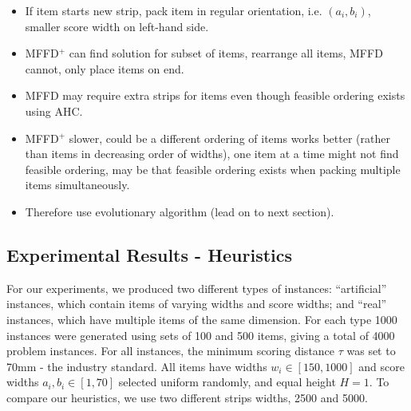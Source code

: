\documentclass{elsarticle}
\begin{document}
\begin{itemize}
	\item If item starts new strip, pack item in regular orientation, i.e. $(a_i, b_i)$, smaller score width on left-hand side.
	\item MFFD$^+$ can find solution for subset of items, rearrange all items, MFFD cannot, only place items on end.
	\item MFFD may require extra strips for items even though feasible ordering exists using AHC.
	\item MFFD$^+$ slower, could be a different ordering of items works better (rather than items in decreasing order of widths), one item at a time might not find feasible ordering, may be that feasible ordering exists when packing multiple items simultaneously.
	\item Therefore use evolutionary algorithm (lead on to next section).
\end{itemize}


\subsection{Experimental Results - Heuristics}
\label{sub:expheuristics}
For our experiments, we produced two different types of instances: ``artificial'' instances, which contain items of varying widths and score widths; and ``real'' instances, which have multiple items of the same dimension. For each type 1000 instances were generated using sets of 100 and 500 items, giving a total of 4000 problem instances. For all instances, the minimum scoring distance $\tau$ was set to 70mm - the industry standard. All items have widths $w_i \in [150,1000]$ and score widths $a_i, b_i \in [1,70]$ selected uniform randomly, and equal height $H=1$. To compare our heuristics, we use two different strips widths, 2500 and 5000.
\end{document}
